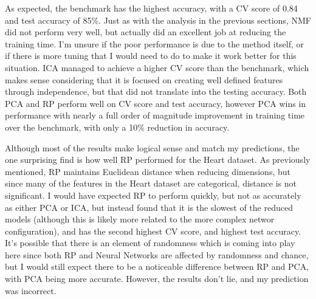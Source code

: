 \documentclass[
	letterpaper, %
]{mlreport}
\begin{document}
As expected, the benchmark has the highest accuracy, with a CV score of 0.84 and test accuracy of 85\%. Just as with the analysis in the previous sections, NMF did not perform very well, but actually did an excellent job at reducing the training time. I'm unsure if the poor performance is due to the method itself, or if there is more tuning that I would need to do to make it work better for this situation. ICA managed to achieve a higher CV score than the benchmark, which makes sense considering that it is focused on creating well defined features through independence, but that did not translate into the testing accuracy. Both PCA and RP perform well on CV score and test accuracy, however PCA wins in performance with nearly a full order of magnitude improvement in training time over the benchmark, with only a 10\% reduction in accuracy.

Although most of the results make logical sense and match my predictions, the one surprising find is how well RP performed for the Heart dataset. As previously mentioned, RP maintains Euclidean distance when reducing dimensions, but since many of the features in the Heart dataset are categorical, distance is not significant. I would have expected RP to perform quickly, but not as accurately as either PCA or ICA, but instead found that it is the slowest of the reduced models (although this is likely more related to the more complex networ configuration), and has the second highest CV score, and highest test accuracy. It's possible that there is an element of randomness which is coming into play here since both RP and Neural Networks are affected by randomness and chance, but I would still expect there to be a noticeable difference between RP and PCA, with PCA being more accurate. However, the results don't lie, and my prediction was incorrect.


\nocite{Mitchell}
\printbibliography
\end{document}
